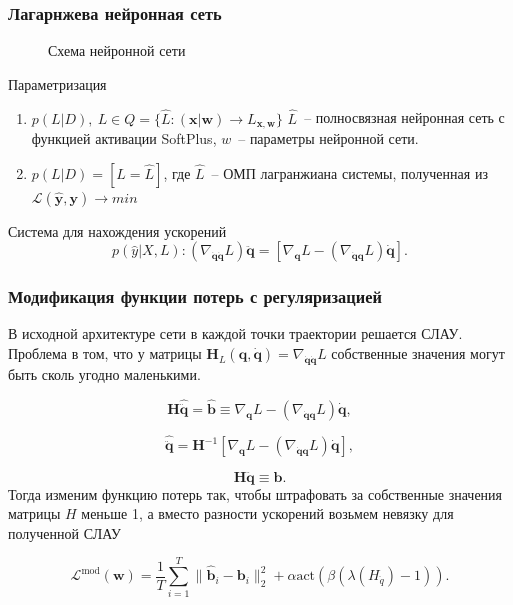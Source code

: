 \documentclass{beamer}
\begin{document}
\begin{frame}
\frametitle{Лагарнжева нейронная сеть}

\begin{figure}[H]
\centerline{
}
\caption{Схема нейронной сети}
\label{fig: LNN}
\end{figure}
\begin{block}{Параметризация}
\begin{enumerate}
\item$p(L|D),\ L \in Q = \{\hat{L} \colon (\mathbf{x} | \mathbf{w}) \to L_{\mathbf{x}, \mathbf{w}}\}$
$\hat{L}$~-- полносвязная нейронная сеть с функцией активации SoftPlus, $w$~-- параметры нейронной сети.
\item $p(L|D) = [L = \hat{L}]$, где $\hat{L}$~-- ОМП лагранжиана системы, полученная из $\mathcal{L}(\hat{\mathbf{y}}, \mathbf{y}) \to min$
\end{enumerate}
\end{block}

\begin{block}{Система для нахождения ускорений}
\[
p(\hat{y}| X, L): \left(\nabla_{\dot{\mathbf{q}} \dot{\mathbf{q}}} L\right)\ddot{\mathbf{q}} = \left[\nabla_{\mathbf{q}} L-\left(\nabla_{\dot{\mathbf{q}}\mathbf{q}} L\right) \dot{\mathbf{q}}\right].
\]
\end{block}

\end{frame}



\begin{frame}
\frametitle{Модификация функции потерь с регуляризацией}
В исходной архитектуре сети в каждой точки траектории решается СЛАУ. Проблема в том, что у матрицы $\mathbf{H}_L(\mathbf{q}, \dot{\mathbf{q}}) = \nabla_{\dot{\mathbf{q}} \dot{\mathbf{q}}} L$ собственные значения могут быть сколь угодно маленькими. 

 \[\mathbf{H}\hat{\ddot{\mathbf{q}}} = \hat{\mathbf{b}} \equiv \nabla_{\mathbf{q}} L-\left(\nabla_{\dot{\mathbf{q}}\mathbf{q}} L\right) \dot{\mathbf{q}}, \]

$$
\hat{\ddot{\mathbf{q}}} = \mathbf{H}^{-1}\left[\nabla_{\mathbf{q}} L-\left(\nabla_{\dot{\mathbf{q}}\mathbf{q}} L\right) \dot{\mathbf{q}}\right],
$$

$$
\mathbf{H}\ddot{\mathbf{q}} \equiv \mathbf{b}.
$$
Тогда изменим функцию потерь так, чтобы штрафовать за собственные значения матрицы $H$  меньше 1, а вместо разности ускорений возьмем невязку для полученной СЛАУ

$$
 \mathcal{L}^{\text{mod}}(\textbf{w}) = \frac{1}{T}\sum_{i=1}^{T} \| \mathbf{\hat{b}}_i - \mathbf{b}_i \|_2^2  + \alpha \text{act}(\beta (\lambda(H_{\ddot{q}}) - 1)).
$$
\end{frame}
\end{document}
